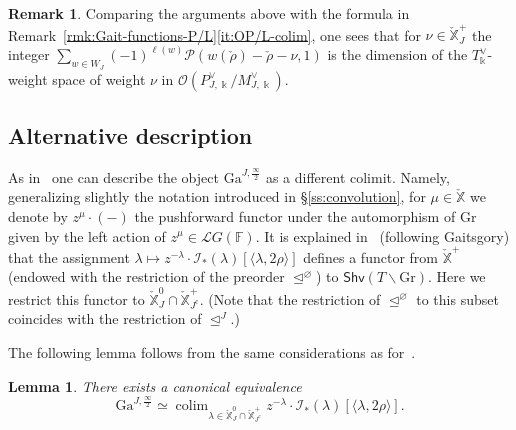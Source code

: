 \documentclass[11pt]{amsart}
\numberwithin{equation}{section}
\theoremstyle{plain}
\newtheorem{lem}[thm]{Lemma}
\theoremstyle{definition}
\newtheorem{rmk}[thm]{Remark}
\newcommand{\F}{{\mathbb F}}
\newcommand{\sI}{{\mathcal I}}
\renewcommand{\k}{\Bbbk}
\newcommand{\sL}{{\mathcal L}}
\newcommand{\sO}{{\mathcal O}}
\newcommand{\sP}{{\mathcal P}}
\newcommand{\X}{{\mathbb X}}
\newcommand{\Xd}{\check{\X}}
\newcommand{\semi}{{{\frac{\infty}{2}}}}
\newcommand{\Shv}{\mathsf{Shv}}
\newcommand{\Gr}{\mathrm{Gr}}
\newcommand{\comp}{\mathrm{c}}
\newcommand{\Gait}{\mathrm{Ga}}
\DeclareMathOperator*{\colim}{colim}
\begin{document}
\begin{rmk}
Comparing the arguments above with the formula in Remark~\ref{rmk:Gait-functions-P/L}\eqref{it:OP/L-colim}, one sees that for $\nu \in \Xd_J^+$ the integer $\sum_{w\in W_J} (-1)^{\ell(w)} \sP(w({\check \rho})-{\check \rho} -\nu, 1)$ is the dimension of the $T^\vee_\k$-weight space of weight $\nu$ in $\mathscr{O}(P^\vee_{J,\k} / M^\vee_{J,\k})$.
\end{rmk}

\subsection{Alternative description}
\label{ss:Gaitsgory-alternative}

As in~\cite[\S 8.3]{adr} one can describe the object $\Gait^{J,\semi}$ as a different colimit. Namely, generalizing slightly the notation introduced in \S\ref{ss:convolution}, for $\mu \in \Xd$ we denote by $z^\mu \cdot (-)$ the pushforward functor under the automorphism of $\Gr$ given by the left action of $z^\mu \in \sL G(\F)$. It is explained in~\cite[\S 8.3]{adr} (following Gaitsgory) that the assignment $\lambda \mapsto z^{-\lambda} \cdot \sI_*(\lambda)[\langle \lambda,2\rho \rangle]$ defines a functor from $\Xd^+$ (endowed with the restriction of the preorder $\unlhd^\varnothing$) to $\Shv(T \backslash \Gr)$. Here we restrict this functor to $\Xd_J^0 \cap \Xd^+_{J^\comp}$. (Note that the restriction of $\unlhd^\varnothing$ to this subset coincides with the restriction of $\unlhd^J$.)

The following lemma follows from the same considerations as for~\cite[Proposition~8.6]{adr}.

\begin{lem}
\label{lem:Gait-alternative}
There exists a canonical equivalence
\[
\Gait^{J,\semi} \simeq \colim_{\lambda \in \Xd_J^0 \cap \Xd^+_{J^\comp}} z^{-\lambda} \cdot \sI_*(\lambda)[\langle \lambda,2\rho \rangle].
\]
\end{lem}
\end{document}
